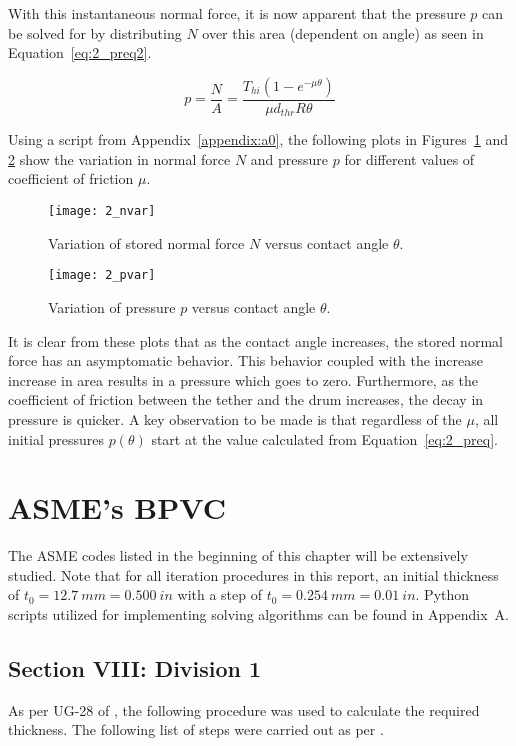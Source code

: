 With this instantaneous normal force, it is now apparent that the pressure $p$ can be solved for by distributing $N$ over this area (dependent on angle) as seen in Equation~\ref{eq:2_preq2}.

\begin{equation}
	\label{eq:2_preq2}
	p=\frac{N}{A}= \frac{T_{hi} \left( 1 - e^{-\mu \theta} \right)}{\mu d_{thr} R \theta}
\end{equation}

Using a script from Appendix~\ref{appendix:a0}, the following plots in Figures~\ref{fig:2_nvar} and \ref{fig:2_pvar} show the variation in normal force $N$ and pressure $p$ for different values of coefficient of friction $\mu$.

\begin{figure}[H]
	\centering
	\texttt{[image: 2\_nvar]}
	\caption{Variation of stored normal force $N$ versus contact angle $\theta$.}
	\label{fig:2_nvar}
\end{figure}

\begin{figure}[H]
	\centering
	\texttt{[image: 2\_pvar]}
	\caption{Variation of pressure $p$ versus contact angle $\theta$.}
	\label{fig:2_pvar}
\end{figure}

It is clear from these plots that as the contact angle increases, the stored normal force has an asymptomatic behavior. This behavior coupled with the increase increase in area results in a pressure which goes to zero. Furthermore, as the coefficient of friction between the tether and the drum increases, the decay in pressure is quicker. A key observation to be made is that regardless of the $\mu$, all initial pressures $p(\theta)$ start at the value calculated from Equation~\ref{eq:2_preq}.  

\section{ASME's BPVC}

The ASME codes listed in the beginning of this chapter will be extensively studied. Note that for all iteration procedures in this report, an initial thickness of $t_0 = 12.7\ mm=0.500\ in$ with a step of $t_0 = 0.254\ mm=0.01\ in$. Python scripts utilized for implementing solving algorithms can be found in Appendix~A.
\subsection{Section VIII: Division 1}
As per UG-28 of \cite{ASMEbvpcVII1}, the following procedure was used to calculate the required thickness.
The following list of steps were carried out as per \cite{ASMEbvpcVII1}.

